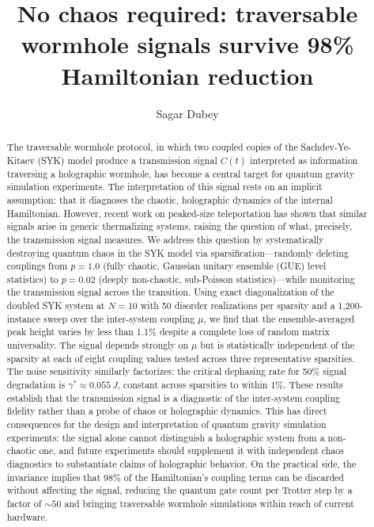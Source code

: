 \documentclass[aps,prd,twocolumn,superscriptaddress,nofootinbib,floatfix]{revtex4-2}
\begin{document}
\title{No chaos required: traversable wormhole signals survive 98\% Hamiltonian reduction}

\author{Sagar Dubey}

\begin{abstract}
The traversable wormhole protocol, in which two coupled copies of the
Sachdev-Ye-Kitaev (SYK) model produce a transmission signal $C(t)$
interpreted as information traversing a holographic wormhole, has become
a central target for quantum gravity simulation experiments. The
interpretation of this signal rests on an implicit assumption: that it
diagnoses the chaotic, holographic dynamics of the internal Hamiltonian.
However, recent work on peaked-size teleportation has shown that similar
signals arise in generic thermalizing systems, raising the question of
what, precisely, the transmission signal measures. We address this
question by systematically destroying quantum chaos in the SYK model via
sparsification---randomly deleting couplings from $p=1.0$ (fully chaotic,
Gaussian unitary ensemble (GUE) level statistics) to $p=0.02$ (deeply non-chaotic, sub-Poisson
statistics)---while monitoring the transmission signal across the
transition. Using exact diagonalization of the doubled SYK system at
$N=10$ with 50 disorder realizations per sparsity and a 1{,}200-instance
sweep over the inter-system coupling $\mu$, we find that the
ensemble-averaged peak height varies by less than 1.1\% despite a
complete loss of random matrix universality. The signal depends strongly
on $\mu$ but is statistically independent of the sparsity at each of
eight coupling values tested across three representative sparsities. The noise sensitivity similarly factorizes:
the critical dephasing rate for 50\% signal degradation is
$\gamma^* \approx 0.055\,J$, constant across sparsities to within 1\%.
These results establish that the transmission signal is a diagnostic of
the inter-system coupling fidelity rather than a probe of chaos or
holographic dynamics. This has direct consequences for the design and
interpretation of quantum gravity simulation experiments: the signal
alone cannot distinguish a holographic system from a non-chaotic one, and
future experiments should supplement it with independent chaos diagnostics
to substantiate claims of holographic behavior. On the practical side,
the invariance implies that 98\% of the Hamiltonian's coupling terms can
be discarded without affecting the signal, reducing the quantum gate count
per Trotter step by a factor of ${\sim}50$ and bringing traversable
wormhole simulations within reach of current hardware.
\end{abstract}
\end{document}
